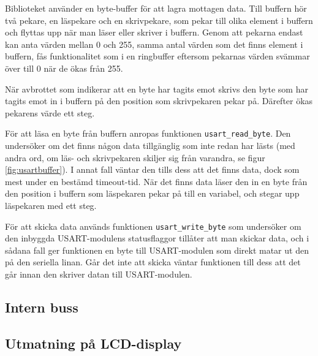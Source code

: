 Biblioteket använder en byte-buffer för att lagra mottagen data. Till buffern hör två pekare, en läspekare och en skrivpekare, som pekar till olika element i buffern och flyttas upp när man läser eller skriver i buffern. Genom att pekarna endast kan anta värden mellan 0 och 255, samma antal värden som det finns element i buffern, fås funktionalitet som i en ringbuffer eftersom pekarnas värden svämmar över till 0 när de ökas från 255.

När avbrottet som indikerar att en byte har tagits emot skrivs den byte som har tagits emot in i buffern på den position som skrivpekaren pekar på. Därefter ökas pekarens värde ett steg.


För att läsa en byte från buffern anropas funktionen \verb|usart_read_byte|. Den undersöker om det finns någon data tillgänglig som inte redan har lästs (med andra ord, om läs- och skrivpekaren skiljer sig från varandra, se figur \ref{fig:usartbuffer}). I annat fall väntar den tills dess att det finns data, dock som mest under en bestämd timeout-tid. När det finns data läser den in en byte från den position i buffern som läspekaren pekar på till en variabel, och stegar upp läspekaren med ett steg.

För att skicka data används funktionen \verb|usart_write_byte| som undersöker om den inbyggda USART-modulens statusflaggor tillåter att man skickar data, och i sådana fall ger funktionen en byte till USART-modulen som direkt matar ut den på den seriella linan. Går det inte att skicka väntar funktionen till dess att det går innan den skriver datan till USART-modulen.

\subsection{Intern buss}
\label{sec:bus}

\subsection{Utmatning på LCD-display}
\label{sec:lcd_interface}
